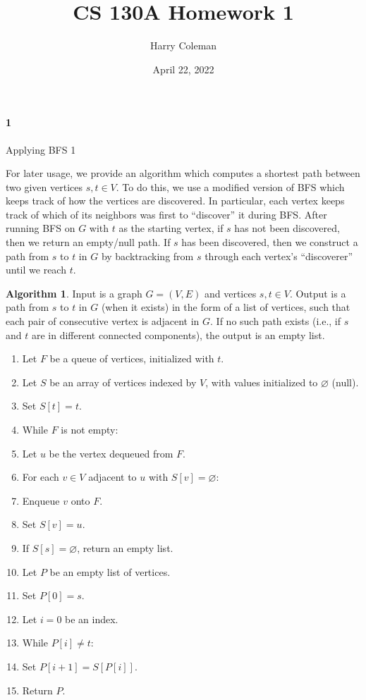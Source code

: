 \documentclass[12pt]{article}
\renewcommand{\maketitle}{\thispagestyle{title}}
\newlength{\myparskip}
\newenvironment{fullbox}{\begin{lrbox}{\savefullbox}\begin{minipage}{\dimexpr\textwidth-2\fboxsep\relax}\setlength{\parskip}{\myparskip}}{\end{minipage}\end{lrbox}\framebox[\textwidth]{\usebox{\savefullbox}}}
\newenvironment{pbox}[1][]{\begin{fullbox}\def\temp{#1}\ifx\temp\empty\else\paragraph{#1}\phantom{}\fi}{\end{fullbox}}
\theoremstyle{definition}
\newtheorem{algorithm}{Algorithm}
\renewcommand{\emptyset}{\varnothing}
\newcommand{\<}{\langle}
\renewcommand{\>}{\rangle}
\newcommand{\tab}{\hspace{1cm}}
\begin{document}
\title{CS 130A Homework 1}
\author{Harry Coleman}
\date{April 22, 2022}
\maketitle

\begin{pbox}[1]
    Applying BFS 1
\end{pbox}

For later usage, we provide an algorithm which computes a shortest path between two given vertices $s, t \in V$.
To do this, we use a modified version of BFS which keeps track of how the vertices are discovered.
In particular, each vertex keeps track of which of its neighbors was first to ``discover'' it during BFS.
After running BFS on $G$ with $t$ as the starting vertex, if $s$ has not been discovered, then we return an empty/null path.
If $s$ has been discovered, then we construct a path from $s$ to $t$ in $G$ by backtracking from $s$ through each vertex's ``discoverer'' until we reach $t$.

\begin{algorithm}
    Input is a graph $G = (V, E)$ and vertices $s, t \in V$.
    Output is a path from $s$ to $t$ in $G$ (when it exists) in the form of a list of vertices, such that each pair of consecutive vertex is adjacent in $G$.
    If no such path exists (i.e., if $s$ and $t$ are in different connected components), the output is an empty list.

    \begin{enumerate}
        \item Let $F$ be a queue of vertices, initialized with $t$.
        \item Let $S$ be an array of vertices indexed by $V$, with values initialized to $\emptyset$ (null).
        \item Set $S[t] = t$.
        \item While $F$ is not empty:
        \item \tab Let $u$ be the vertex dequeued from $F$.
        \item \tab For each $v \in V$ adjacent to $u$ with $S[v] = \emptyset$:
        \item \tab\tab Enqueue $v$ onto $F$.
        \item \tab\tab Set $S[v] = u$.
        \item If $S[s] = \emptyset$, return an empty list.
        \item Let $P$ be an empty list of vertices.
        \item Set $P[0] = s$.
        \item Let $i = 0$ be an index.
        \item While $P[i] \ne t$:
        \item \tab Set $P[i + 1] = S[P[i]]$.
        \item Return $P$.
    \end{enumerate}
\end{algorithm}
\end{document}
